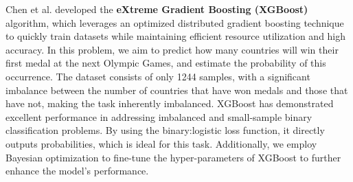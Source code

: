 \documentclass[12pt]{article}  %
\begin{document}
Chen et al. developed the \textbf{eXtreme Gradient Boosting (XGBoost)} algorithm, which leverages an optimized distributed gradient boosting technique to quickly train datasets while maintaining efficient resource utilization and high accuracy\cite{4}. In this problem, we aim to predict how many countries will win their first medal at the next Olympic Games, and estimate the probability of this occurrence.
The dataset consists of only 1244 samples, with a significant imbalance between the number of countries that have won medals and those that have not, making the task inherently imbalanced. XGBoost has demonstrated excellent performance in addressing imbalanced and small-sample binary classification problems\cite{5}\cite{6}. By using the binary:logistic loss function, it directly outputs probabilities, which is ideal for this task. Additionally, we employ Bayesian optimization to fine-tune the hyper-parameters of XGBoost to further enhance the model's performance\cite{7}.
\end{document}
